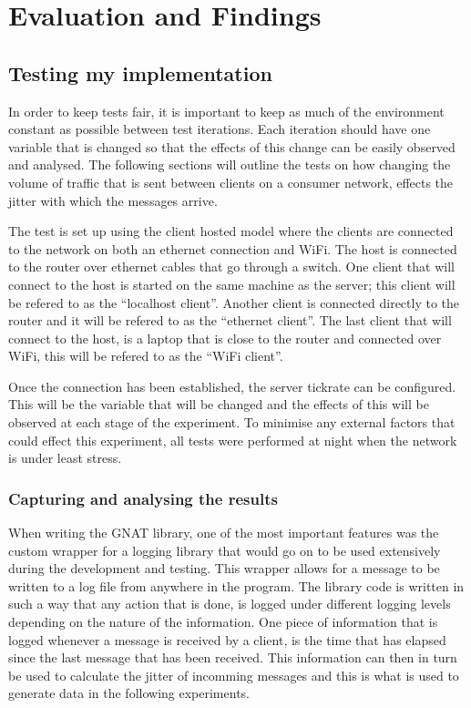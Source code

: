 \chapter{Evaluation and Findings}



\section{Testing my implementation}
In order to keep tests fair, it is important to keep as much of the environment constant as possible between test iterations. Each iteration should have one variable that is changed so that the effects of this change can be easily observed and analysed. The following sections will outline the tests on how changing the volume of traffic that is sent between clients on a consumer network, effects the jitter with which the messages arrive.

The test is set up using the client hosted model where the clients are connected to the network on both an ethernet connection and WiFi. The host is connected to the router over ethernet cables that go through a switch. One client that will connect to the host is started on the same machine as the server; this client will be refered to as the ``localhost client''. Another client is connected directly to the router and it will be refered to as the ``ethernet client''. The last client that will connect to the host, is a laptop that is close to the router and connected over WiFi, this will be refered to as the ``WiFi client''.

Once the connection has been established, the server tickrate can be configured. This will be the variable that will be changed and the effects of this will be observed at each stage of the experiment. To minimise any external factors that could effect this experiment, all tests were performed at night when the network is under least stress.

\subsection{Capturing and analysing the results}
When writing the GNAT library, one of the most important features was the custom wrapper for a logging library that would go on to be used extensively during the development and testing. This wrapper allows for a message to be written to a log file from anywhere in the program. The library code is written in such a way that any action that is done, is logged under different logging levels depending on the nature of the information. One piece of information that is logged whenever a message is received by a client, is the time that has elapsed since the last message that has been received. This information can then in turn be used to calculate the jitter of incomming messages and this is what is used to generate data in the following experiments.


